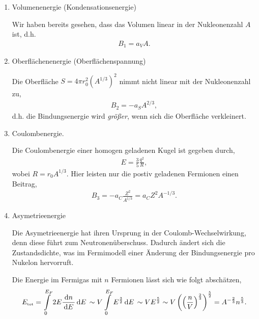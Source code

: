 \begin{enumerate}[label=\arabic{*}.)]
  \item Volumenenergie (Kondensationsenergie)

Wir haben bereits gesehen, dass das Volumen linear in der Nukleonenzahl $A$
ist, d.h.
\begin{align*}
B_1 = a_V A.%
\end{align*}
\item Oberflächenenergie (Oberflächenspannung)

Die Oberfläche $S = 4\pi r_0^2\left(A^{1/3}\right)^2$ nimmt nicht linear mit der
Nukleonenzahl zu,
\begin{align*}
B_2 = -a_S A^{2/3},
\end{align*}
d.h. die Bindungsenergie wird \textit{größer}, wenn sich die Oberfläche
verkleinert.
\item Coulombenergie.

Die Coulombenergie einer homogen geladenen Kugel ist gegeben durch,
\begin{align*}
E = \frac{3}{5}\frac{q^2}{R},
\end{align*}
wobei $R = r_0 A^{1/3}$. Hier leisten nur die postiv geladenen Fermionen einen
Beitrag,
\begin{align*}
B_3 = -a_C \frac{Z^2}{A^{1/3}} = a_C Z^2 A^{-1/3}.
\end{align*}
\item Asymetrieenergie

Die Asymetrieenergie hat ihren Ursprung in der Coulomb-Wechselwirkung, denn
diese führt zum Neutronenüberschuss. Dadurch ändert sich die Zustandsdichte,
was im Fermimodell einer Änderung der Bindungsenergie pro Nukelon hervorruft.

Die Energie im Fermigas mit $n$ Fermionen lässt sich wie folgt abschätzen,
\begin{align*}
E_{\text{\tiny tot}} = \int\limits_0^{E_F} 2E\frac{\,\mathrm{d} n\,}{\,\mathrm{d} E\,}\,\mathrm{d} E\,
\sim V\int\limits_{0}^{E_F} E^{\frac{3}{2}}\,\mathrm{d} E\, \sim VE^{\frac{5}{2}}
\sim V\left(\left(\frac{n}{V}\right)^{\frac{2}{3}} \right)^{\frac{5}{2}}
= A^{-\frac{2}{3}}n^{\frac{5}{3}}.
\end{align*}


\end{enumerate}
